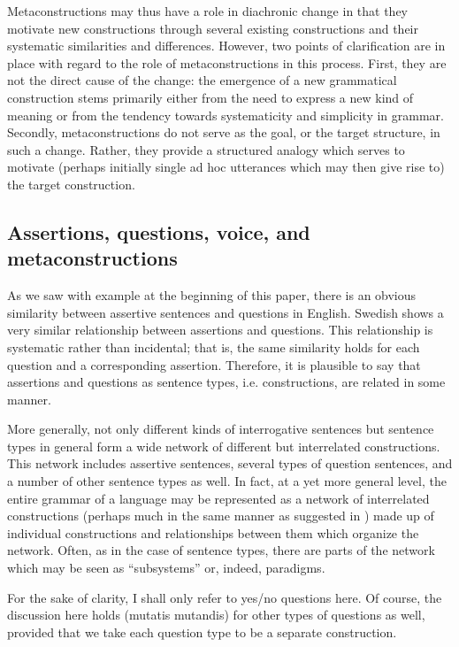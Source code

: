 \documentclass[output=paper, colorlinks,citecolor=brown]{langsci/langscibook}
\begin{document}
Metaconstructions may thus have a role in diachronic change in that they motivate new constructions through several existing constructions and their systematic similarities and differences. However, two points of clarification are in place with regard to the role of metaconstructions in this process. First, they are not the direct cause of the change: the emergence of a new grammatical construction stems primarily either from the need to express a new kind of meaning or from the tendency towards systematicity and simplicity in grammar. Secondly, metaconstructions do not serve as the goal, or the target structure, in such a change. Rather, they provide a structured analogy which serves to motivate (perhaps initially single ad hoc utterances which may then give rise to) the target construction.

\subsection{Assertions, questions, voice, and metaconstructions}\label{sec:leino_2.2}

As we saw with example  at the beginning of this paper, there is an obvious similarity between assertive sentences and questions in English. Swedish shows a very similar relationship between assertions and questions. This relationship is systematic rather than incidental; that is, the same similarity holds for each question and a corresponding assertion. Therefore, it is plausible to say that assertions and questions as sentence types, i.e. constructions, are related in some manner.

More generally, not only different kinds of interrogative sentences but sentence types in general form a wide network of different but interrelated constructions. This network includes assertive sentences, several types of question sentences, and a number of other sentence types as well. In fact, at a yet more general level, the entire grammar of a language may be represented as a network of interrelated constructions (perhaps much in the same manner as suggested in \citealt{Diessel2019}) made up of individual constructions and relationships between them which organize the network. Often, as in the case of sentence types, there are parts of the network which may be seen as “subsystems” or, indeed, paradigms.

For the sake of clarity, I shall only refer to yes/no questions here. Of course, the discussion here holds (mutatis mutandis) for other types of questions as well, provided that we take each question type to be a separate construction.
\end{document}

